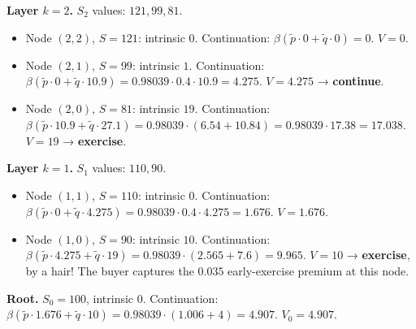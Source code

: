\documentclass[
  10pt,
  twoside]{book}
\providecommand{\tightlist}{%
  \setlength{\itemsep}{0pt}\setlength{\parskip}{0pt}}
\begin{document}
\textbf{Layer \(k = 2\).} \(S_2\) values: \(121, 99, 81\).

\begin{itemize}
\tightlist
\item
  Node \((2, 2)\), \(S = 121\): intrinsic \(0\). Continuation:
  \(\beta(\tilde p \cdot 0 + \tilde q\cdot 0) = 0\). \(V = 0\).
\item
  Node \((2, 1)\), \(S = 99\): intrinsic \(1\). Continuation:
  \(\beta(\tilde p\cdot 0 + \tilde q\cdot 10.9) = 0.98039\cdot 0.4\cdot 10.9 = 4.275\).
  \(V = 4.275\) → \textbf{continue}.
\item
  Node \((2, 0)\), \(S = 81\): intrinsic \(19\). Continuation:
  \(\beta(\tilde p\cdot 10.9 + \tilde q\cdot 27.1) = 0.98039\cdot(6.54 + 10.84) = 0.98039\cdot 17.38 = 17.038\).
  \(V = 19\) → \textbf{exercise}.
\end{itemize}

\textbf{Layer \(k = 1\).} \(S_1\) values: \(110, 90\).

\begin{itemize}
\tightlist
\item
  Node \((1, 1)\), \(S = 110\): intrinsic \(0\). Continuation:
  \(\beta(\tilde p\cdot 0 + \tilde q\cdot 4.275) = 0.98039\cdot 0.4\cdot 4.275 = 1.676\).
  \(V = 1.676\).
\item
  Node \((1, 0)\), \(S = 90\): intrinsic \(10\). Continuation:
  \(\beta(\tilde p\cdot 4.275 + \tilde q\cdot 19) = 0.98039\cdot(2.565 + 7.6) = 9.965\).
  \(V = 10\) → \textbf{exercise}, by a hair! The buyer captures the
  \(0.035\) early-exercise premium at this node.
\end{itemize}

\textbf{Root.} \(S_0 = 100\), intrinsic \(0\). Continuation:
\(\beta(\tilde p\cdot 1.676 + \tilde q\cdot 10) = 0.98039\cdot(1.006 + 4) = 4.907\).
\(V_0 = 4.907\).
\end{document}
